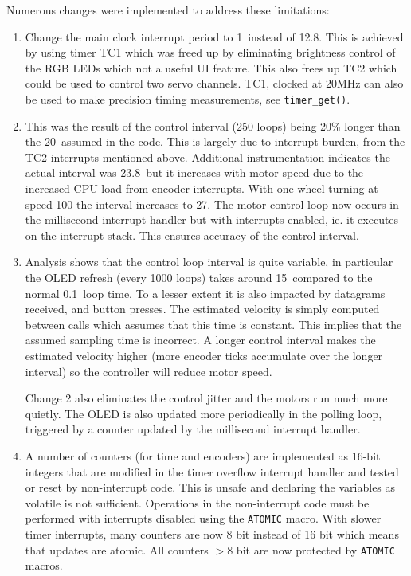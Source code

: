 \documentclass[11pt,fleqn]{article}
\begin{document}
Numerous changes were implemented to address these limitations:
\begin{enumerate}

\item Change the main clock interrupt period to 1\ms\ instead of 12.8\us.  This is achieved by using timer TC1 which was freed up by eliminating brightness control of the RGB LEDs which not a useful UI feature.  This also frees up TC2 which could be used to control
two servo channels.  TC1, clocked at 20\unit{MHz} can also be used to make precision timing measurements, see \texttt{timer\_get()}.

\item This was the result of the control interval (250 loops) being 20\% longer
than the 20\ms\ assumed in the code.  This is largely due to interrupt burden, from the TC2 interrupts mentioned above. Additional instrumentation indicates the actual interval was 23.8\ms\ but it increases with motor speed due to the increased CPU load from encoder interrupts.  With one wheel turning at speed 100 the interval increases to 27\ms. 
The motor control loop now occurs in the millisecond interrupt handler but with interrupts enabled, ie. it executes on the interrupt stack.
This ensures accuracy of the control interval. 

\item Analysis shows that the control loop interval is quite variable, in particular
the OLED refresh (every 1000 loops) takes around 15\ms\ compared to the normal 0.1\ms\ loop time.
To a lesser extent it is also impacted by datagrams received, and button presses.
The estimated velocity is simply computed between calls which assumes that this time is constant.
This implies that the assumed sampling time is incorrect.  A longer control interval makes the estimated velocity higher (more encoder ticks accumulate over the longer interval) so the controller will
reduce motor speed.

Change 2 also eliminates the control jitter and the motors run much more quietly.
The OLED is also updated more periodically in the polling loop, triggered by a counter updated by the millisecond interrupt handler.  

\item A number of counters (for time and encoders) are implemented as 16-bit integers that are modified in the timer overflow interrupt handler and tested or reset by non-interrupt code.  This is unsafe
and declaring the variables as volatile is not sufficient.  Operations in the non-interrupt code must be performed with interrupts disabled using the \texttt{ATOMIC} macro.  With slower timer interrupts, many counters are now 8 bit instead of 16 bit which means that updates are atomic.  All  counters $> 8$ bit
are now protected by \texttt{ATOMIC} macros.


\end{enumerate}
\end{document}
